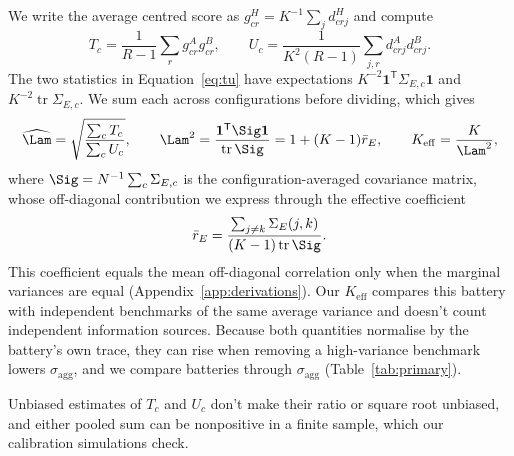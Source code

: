 We write the average centred score as $g^H_{cr}=K^{-1}\sum_j d^H_{crj}$ and compute
\begin{equation}
T_c=\frac{1}{R-1}\sum_r g^A_{cr}g^B_{cr},\qquad
U_c=\frac{1}{K^2(R-1)}\sum_{j,r}d^A_{crj}d^B_{crj}.
\label{eq:tu}
\end{equation}
The two statistics in Equation~\ref{eq:tu} have expectations $K^{-2}\mathbf{1}^{\mathsf T}\Sigma_{E,c}\mathbf{1}$ and $K^{-2}\operatorname{tr}\Sigma_{E,c}$. We sum each across configurations before dividing, which gives
\begin{equation}
\widehat\Lam=\sqrt{\frac{\sum_c T_c}{\sum_c U_c}},\qquad
\Lam^2=\frac{\mathbf{1}^{\mathsf T}\Sig\mathbf{1}}{\operatorname{tr}\Sig}
=1+(K-1)\bar r_E,\qquad K_{\mathrm{eff}}=\frac{K}{\Lam^2},
\label{eq:lambda}
\end{equation}
where $\Sig=N^{-1}\sum_c\Sigma_{E,c}$ is the configuration-averaged covariance matrix, whose off-diagonal contribution we express through the effective coefficient
\begin{equation}
\bar r_E=\frac{\sum_{j\ne k}\Sigma_E(j,k)}{(K-1)\operatorname{tr}\Sig}.
\label{eq:effective}
\end{equation}
This coefficient equals the mean off-diagonal correlation only when the marginal variances are equal (Appendix~\ref{app:derivations}). Our $K_{\mathrm{eff}}$ compares this battery with independent benchmarks of the same average variance and doesn't count independent information sources. Because both quantities normalise by the battery's own trace, they can rise when removing a high-variance benchmark lowers $\sigma_{\mathrm{agg}}$, and we compare batteries through $\sigma_{\mathrm{agg}}$ (Table~\ref{tab:primary}).

Unbiased estimates of $T_c$ and $U_c$ don't make their ratio or square root unbiased, and either pooled sum can be nonpositive in a finite sample, which our calibration simulations check.

